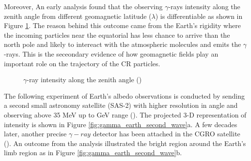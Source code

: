 Moreover, An early analysis found 
that the observing $\gamma$-rays intensity along the zenith angle
from different geomagnetic latitude ($\lambda$) is differentiable
as shown in Figure \ref{fig:explorer_xi_zenith}. The reason behind 
this outcome came from the Earth's rigidity where the incoming 
particles near the equatorial has less chance to arrive than the 
north pole and likely to intereact with the atmospheric molecules 
and emits the $\gamma$-rays. This is the seceondary 
evidence of how geomagnetic fields play an important role on the 
trajectory of the CR particles. 

\begin{figure}[h]
    \centering
        \hfill
        \caption{
            $\gamma$-ray intensity along the zenith angle
            (\cite{kraushaar1965explorer})  
        }
       \label{fig:explorer_xi_zenith}
\end{figure}

The following experiment of Earth's albedo observations is conducted 
by sending a second small astronomy satellite (SAS-2) with higher 
resolution in angle and observing above 35 MeV up to GeV range
(\cite{Thompson81}). The projected 3-D representation of intensity
is shown in Figure \ref{fig:gamma_earth_second_wave}a. A few decades 
later, another precise $\gamma-ray$ detector has been attached in the 
CGRO satellite (\cite{Petry05}). An outcome from the analysis 
illustrated the bright region around the Earth's limb region as 
in Figure \ref{fig:gamma_earth_second_wave}b.


